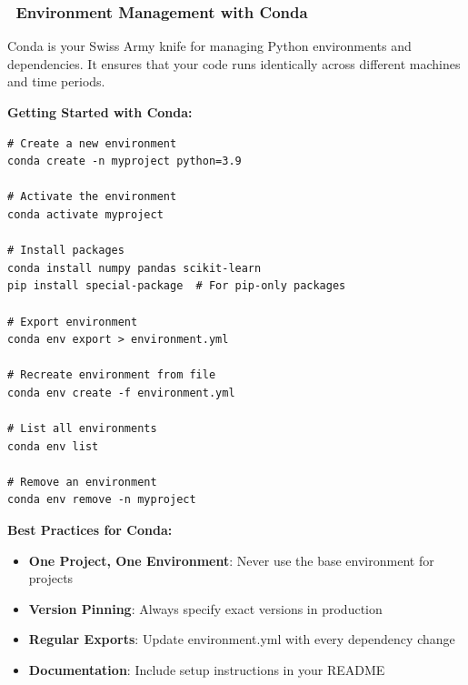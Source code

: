 \documentclass[11pt,a4paper]{article}
\begin{document}
\subsubsection{\faCubes~Environment Management with Conda}

Conda is your Swiss Army knife for managing Python environments and dependencies. It ensures that your code runs identically across different machines and time periods.

\textbf{Getting Started with Conda:}

\begin{tcolorbox}[colback=green!5,colframe=green!50,title={Essential Conda Commands}]
\begin{lstlisting}[style=bashstyle]
# Create a new environment
conda create -n myproject python=3.9

# Activate the environment
conda activate myproject

# Install packages
conda install numpy pandas scikit-learn
pip install special-package  # For pip-only packages

# Export environment
conda env export > environment.yml

# Recreate environment from file
conda env create -f environment.yml

# List all environments
conda env list

# Remove an environment
conda env remove -n myproject
\end{lstlisting}
\end{tcolorbox}

\textbf{Best Practices for Conda:}
\begin{itemize}
    \item \textbf{One Project, One Environment}: Never use the base environment for projects
    \item \textbf{Version Pinning}: Always specify exact versions in production
    \item \textbf{Regular Exports}: Update environment.yml with every dependency change
    \item \textbf{Documentation}: Include setup instructions in your README
\end{itemize}
\end{document}
